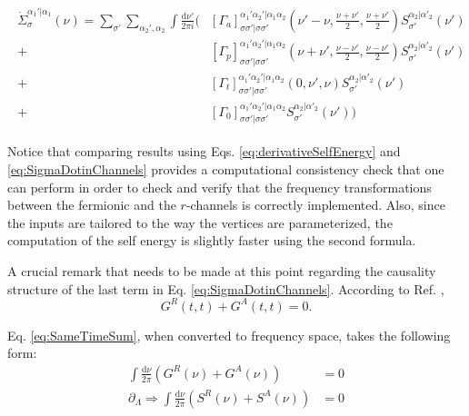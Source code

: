 \documentclass[12pt,a4paper,roman]{article}
\newcommand{\dd}{\mathrm{d}}
\begin{document}
\begin{align}
	\begin{split}
	\dot{\Sigma}^{\alpha_1'|\alpha_1}_\sigma (\nu) = \sum_{\sigma'} \sum_{\alpha_2', \alpha_2} \int \frac{\dd\nu'}{2\pi i} \Bigg( &\left[\Gamma_a\right]^{\alpha_1'\alpha_2'|\alpha_1\alpha_2}_{\sigma\sigma'|\sigma\sigma'}\left(\nu'-\nu, \frac{\nu+\nu'}{2}, \frac{\nu+\nu'}{2}\right) S^{\alpha_2|\alpha'_2}_{\sigma'}(\nu')\\
	+&\left[\Gamma_p\right]^{\alpha_1'\alpha_2'|\alpha_1\alpha_2}_{\sigma\sigma'|\sigma\sigma'}\left(\nu+\nu', \frac{\nu-\nu'}{2}, \frac{\nu-\nu'}{2}\right)
	S^{\alpha_2|\alpha'_2}_{\sigma'}(\nu') \\
	+&\left[\Gamma_t\right]^{\alpha_1'\alpha_2'|\alpha_1\alpha_2}_{\sigma\sigma'|\sigma\sigma'}\left(0, \nu', \nu \right) S^{\alpha_2|\alpha'_2}_{\sigma'}(\nu')\\
	+&\left[\Gamma_0\right]^{\alpha_1'\alpha_2'|\alpha_1\alpha_2}_{\sigma\sigma'|\sigma\sigma'} S^{\alpha_2|\alpha'_2}_{\sigma'}(\nu')\Bigg)\end{split}
	\label{eq:SigmaDotinChannels}
\end{align}

Notice that comparing results using Eqs. \eqref{eq:derivativeSelfEnergy} and \eqref{eq:SigmaDotinChannels} provides a computational consistency check that one can perform in order to check and verify that the frequency transformations between the fermionic and the $r$-channels is correctly implemented. Also, since the inputs are tailored to the way the vertices are parameterized, the computation of the self energy is slightly faster using the second formula.

A crucial remark that needs to be made at this point regarding the causality structure of the last term in Eq. \eqref{eq:SigmaDotinChannels}. According to Ref. \cite{kamenev_2011}, 
\begin{equation}
	G^R(t,t) + G^A(t,t) = 0.
	\label{eq:SameTimeSum}
\end{equation}

Eq. \ref{eq:SameTimeSum}, when converted to frequency space, takes the following form:
\begin{align}
\int \frac{\dd \nu}{2 \pi} \left( G^R(\nu) + G^A(\nu) \right) &= 0\\
\partial_\Lambda\Rightarrow \int \frac{\dd \nu}{2 \pi} \left( S^R(\nu) + S^A(\nu) \right) &= 0
\label{eq:SameTimeConstranit}
\end{align}
\end{document}
